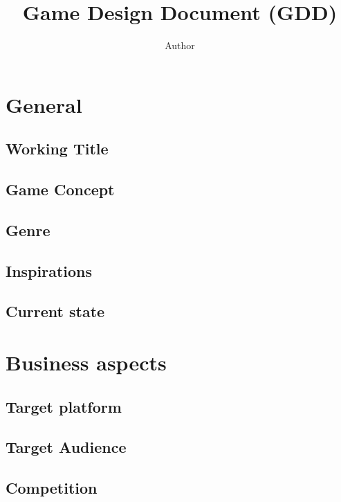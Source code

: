 \documentclass{article}
\title{Game Design Document (GDD)}
\author{Author}
\begin{document}
\maketitle



\section{General}

\subsection{Working Title}



\subsection{Game Concept}



\subsection{Genre}



\subsection{Inspirations}



\subsection{Current state}



\section{Business aspects}

\subsection{Target platform}



\subsection{Target Audience}



\subsection{Competition}
\end{document}
